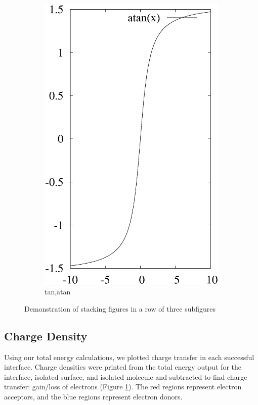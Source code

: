 \documentclass[journal=jacsat,manuscript=article]{achemso}
\begin{document}
\begin{figure}[ht]
\begin{subfigure}{0.3\textwidth}
\includegraphics [width=\textwidth]{atan.eps}
\caption{tan,atan}
\end{subfigure}
\caption{Demonstration of stacking figures in a row of three subfigures}
\label{figure1}
\end{figure}


\subsection{Charge Density}

Using our total energy calculations, 
we plotted charge transfer in each successful interface. 
Charge densities were printed from the total energy output for the interface, isolated surface, 
and isolated molecule and subtracted to find charge transfer: gain/loss of electrons (Figure \ref{figure1}). 
The red regions represent electron acceptors, and the blue regions represent electron donors. 
\end{document}
